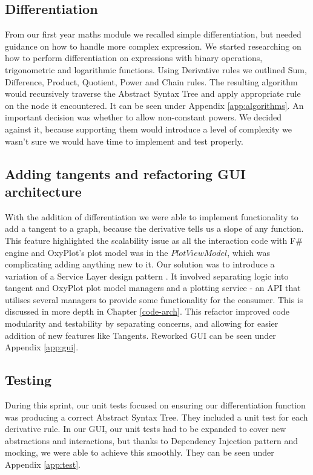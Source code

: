 \documentclass[a4paper, oneside, 11pt]{report}
\begin{document}
\subsection{Differentiation}
From our first year maths module we recalled simple differentiation, but needed guidance on how to handle more complex expression. We started researching on how to perform differentiation on expressions with binary operations, trigonometric and logarithmic functions. Using Derivative rules\cite{Derivatives} we outlined Sum, Difference, Product, Quotient, Power and Chain rules. The resulting algorithm would recursively traverse the Abstract Syntax Tree and apply appropriate rule on the node it encountered. It can be seen under Appendix \ref{app:algorithms}. An important decision was whether to allow non-constant powers. We decided against it, because supporting them would introduce a level of complexity we wasn't sure we would have time to implement and test properly.

\subsection{Adding tangents and refactoring GUI architecture}
With the addition of differentiation we were able to implement functionality to add a tangent to a graph, because the derivative tells us a slope of any function. This feature highlighted the scalability issue as all the interaction code with F\# engine and OxyPlot's plot model was in the $PlotViewModel$, which was complicating adding anything new to it. Our solution was to introduce a variation of a Service Layer design pattern \cite{ServiceLayer:Wiki}. It involved separating logic into tangent and OxyPlot plot model managers and a plotting service - an API that utilises several managers to provide some functionality for the consumer. This is discussed in more depth in Chapter \ref{code-arch}. This refactor improved code modularity and testability by separating concerns, and allowing for easier addition of new features like Tangents. Reworked GUI can be seen under Appendix \ref{app:gui}.

\subsection{Testing}
During this sprint, our unit tests focused on ensuring our differentiation function was producing a correct Abstract Syntax Tree. They included a unit test for each derivative rule. In our GUI, our unit tests had to be expanded to cover new abstractions and interactions, but thanks to Dependency Injection pattern and mocking, we were able to achieve this smoothly. They can be seen under Appendix \ref{app:test}. 
\end{document}
